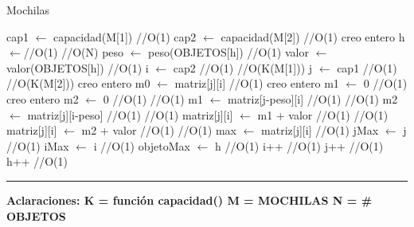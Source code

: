 \begin{algorithm}[H]
\caption{Mochilas}
\begin{algorithmic}[1]
\state cap1 $\gets$ capacidad(M[1]) \hfill //O(1)
\state cap2 $\gets$ capacidad(M[2]) \hfill //O(1)
\state creo entero h $\gets$\hfill //O(1)
 \hfill //O(N)
\state peso $\gets$ peso(OBJETOS[h]) \hfill //O(1)
\state valor $\gets$ valor(OBJETOS[h]) \hfill //O(1)
\state i $\gets$  cap2  \hfill //O(1)
 \hfill //O(K(M[1]))
\state j $\gets$  cap1  \hfill //O(1)
 \hfill //O(K(M[2]))
\state creo entero m0 $\gets$ matriz[j][i] \hfill //O(1)
\state creo entero m1 $\gets$ 0 \hfill //O(1)
\state creo entero m2 $\gets$ 0 \hfill //O(1)
 \hfill //O(1)
\state m1 $\gets$ matriz[j-peso][i] \hfill //O(1)
\endif
{} \hfill //O(1)
\state m2 $\gets$ matriz[j][i-peso] \hfill //O(1)
\endif
{} \hfill //O(1)
\state matriz[j][i] $\gets$ m1 + valor \hfill //O(1)
\Else
{} \hfill //O(1)
\state matriz[j][i] $\gets$ m2 + valor \hfill //O(1)
\endif
{} \hfill //O(1)
\state max $\gets$ matriz[j][i] \hfill //O(1)
\state jMax $\gets$ j \hfill //O(1)
\state iMax $\gets$ i \hfill //O(1)
\state objetoMax $\gets$ h \hfill //O(1)
\endif
\endif
\state i++ \hfill //O(1)
\endwhile
\state j++ \hfill //O(1)
\endwhile
\state h++ \hfill //O(1)
\endwhile
\EndFunction 
\end{algorithmic}
\hrule
{}
\end{algorithm}


\textbf{Aclaraciones:
K = funci\'on capacidad()
M = MOCHILAS
N = \# OBJETOS }